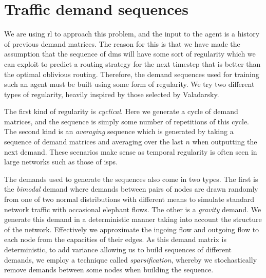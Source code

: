 \section{Traffic demand sequences}
\label{section:demands}
We are using \ac{rl} to approach this problem, and the input to the agent is a history of previous demand matrices. The reason for this is that we have made the assumption that the sequence of \acp{dm} will have some sort of regularity which we can exploit to predict a routing strategy for the next timestep that is better than the optimal oblivious routing. Therefore, the demand sequences used for training such an agent must be built using some form of regularity. We try two different types of regularity, heavily inspired by those selected by Valadarsky\cite{valadarsky2017learning}.

The first kind of regularity is \emph{cyclical}. Here we generate a cycle of demand matrices, and the sequence is simply some number of repetitions of this cycle. The second kind is an \emph{averaging} sequence which is generated by taking a sequence of demand matrices and averaging over the last $n$ when outputting the next demand. These scenarios make sense as temporal regularity is often seen in large networks such as those of \acp{isp}\cite{fortz2002optimizing}.

The demands used to generate the sequences also come in two types. The first is the \emph{bimodal}\cite{medina2002traffic} demand where demands between pairs of nodes are drawn randomly from one of two normal distributions with different means to simulate standard network traffic with occasional elephant flows. The other is a \emph{gravity} demand\cite{roughan2002experience}. We generate this demand in a deterministic manner taking into account the structure of the network. Effectively we approximate the ingoing flow and outgoing flow to each node from the capacities of their edges. As this demand matrix is deterministic, to add variance allowing us to build sequences of different demands, we employ a technique called \emph{sparsification}, whereby we stochastically remove demands between some nodes when building the sequence.

